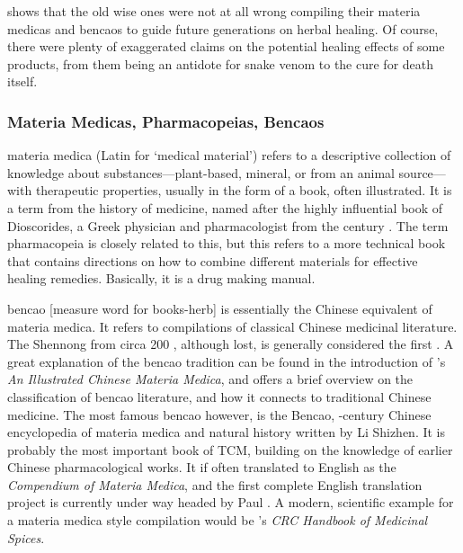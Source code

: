 \autocite{billing_antimicrobial_1998,nilius_spices_2013,yashin_antioxidant_2017} shows that the old wise ones were not at all wrong compiling their \glspl{materia medica} and \glspl{bencao} to guide future generations on herbal healing. Of course, there were plenty of exaggerated claims on the potential healing effects of some products, from them being an antidote for snake venom to the cure for death itself.

\subsubsection{Materia Medicas, Pharmacopeias, Bencaos}

\Gls{materia medica} (Latin for `medical material') refers to a descriptive collection of knowledge about substances---plant-based, mineral, or from an animal source---with therapeutic properties, usually in the form of a book, often illustrated. It is a term from the history of medicine, named after the highly influential book of Dioscorides, a Greek physician and pharmacologist from the  century \AD{}. The term \gls{pharmacopeia} is closely related to this, but this refers to a more technical book that contains directions on how to combine different materials for effective healing remedies. Basically, it is a drug making manual.

\Gls{bencao}  [measure word for books-herb] is essentially the Chinese equivalent of materia medica. It refers to compilations of classical Chinese medicinal literature. The \gls{Shennong} from circa 200 \AD, although lost, is generally considered the first \autocites[see][]{nugent-head_first_2014}{yang_divine_1998}. A great explanation of the \gls{bencao} tradition can be found in the introduction of \textcite{wu_illustrated_2005}'s \textit{An Illustrated Chinese Materia Medica}, and \textcite{zhao_concise_2018} offers a brief overview on the classification of \gls{bencao} literature, and how it connects to traditional Chinese medicine. The most famous \gls{bencao} however, is the \gls{Bencao}, -century Chinese encyclopedia of materia medica and natural history written by Li Shizhen. It is probably the most important book of \gls{TCM}, building on the knowledge of earlier Chinese pharmacological works. It if often translated to English as the \textit{Compendium of Materia Medica}, and the first complete English translation project is currently under way headed by Paul \textcite{unschuld_first_2022}. 
A modern, scientific example for a materia medica style compilation would be \textcite{duke_crc_2002}'s \textit{CRC Handbook of Medicinal Spices}.

